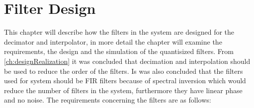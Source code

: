 \chapter{Filter Design}
This chapter will describe how the filters in the system are designed for the decimator and interpolator, in more detail the chapter will examine the requirements, the design and the simulation of the quantisized filters. From \autoref{ch:designRealization} it was concluded that decimation and interpolation should be used to reduce the order of the filters.  
Is was also concluded that the filters used for system should be FIR filters because of spectral inversion which would reduce the number of filters in the system, furthermore they have linear phase and no noise. The requirements concerning the filters are as follows:   
\vspace{-2mm}





%

%

%